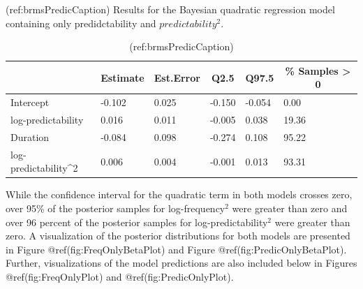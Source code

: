 \documentclass[
  authoryear,
  preprint,
  1p,
  onecolumn]{elsarticle}
\begin{document}
(ref:brmsPredicCaption) Results for the Bayesian quadratic regression
model containing only predidctability and \(predictability^2\).

\begin{table}[H]

\begin{center}
\begin{threeparttable}

\caption{(ref:brmsPredicCaption)}

\begin{tabular}{llllll}
\toprule
 & \multicolumn{1}{c}{Estimate} & \multicolumn{1}{c}{Est.Error} & \multicolumn{1}{c}{Q2.5} & \multicolumn{1}{c}{Q97.5} & \multicolumn{1}{c}{\% Samples > 0}\\
\midrule
Intercept & -0.102 & 0.025 & -0.150 & -0.054 & 0.00\\
log-predictability & 0.016 & 0.011 & -0.005 & 0.038 & 19.36\\
Duration & -0.084 & 0.098 & -0.274 & 0.108 & 95.22\\
log-predictability\textasciicircum{}2 & 0.006 & 0.004 & -0.001 & 0.013 & 93.31\\
\bottomrule
\end{tabular}

\end{threeparttable}
\end{center}

\end{table}

While the confidence interval for the quadratic term in both models
crosses zero, over 95\% of the posterior samples for log-frequency\(^2\)
were greater than zero and over 96 percent of the posterior samples for
log-predictability\(^2\) were greater than zero. A visualization of the
posterior distributions for both models are presented in Figure
@ref(fig:FreqOnlyBetaPlot) and Figure @ref(fig:PredicOnlyBetaPlot).
Further, visualizations of the model predictions are also included below
in Figures @ref(fig:FreqOnlyPlot) and @ref(fig:PredicOnlyPlot).
\end{document}
